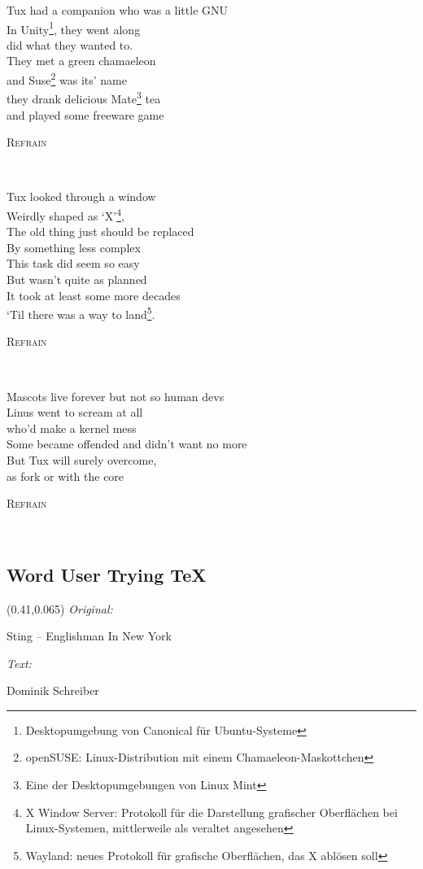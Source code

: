 \documentclass[11pt,a5paper]{article}
\newcommand\refrain[1]{\begin{tcolorbox}#1\end{tcolorbox} \ }
\newcommand{\refrefrain}{\refrain{\textsc{Refrain}} \ }
\newcommand\songinfo[2]{\begin{textblock}{0.5}(0.41,0.065)
		\footnotesize 
		\hfill \textit{Original:} \ \ \ \ \ \ \ \ \ \ \ \ \ \ \ \ \ \ \ \ 
		
		\hfill #1
		
		\hfill  \textit{Text:} \ \ \ \ \ \ \ \ \ \ \ \ \ \ \ \ \ \ \ \ 
		
		\hfill #2
	\end{textblock}}
\begin{document}
	Tux had a companion who was a little GNU \\
	In Unity\footnote{\scriptsize Desktopumgebung von Canonical für Ubuntu-Systeme}, they went along \\
	did what they wanted to. \\
	They met a green chamaeleon \\
	and Suse\footnote{\scriptsize openSUSE: Linux-Distribution mit einem Chamaeleon-Maskottchen} was its’ name \\
	they drank delicious Mate\footnote{\scriptsize Eine der Desktopumgebungen von Linux Mint} tea \\ 
	and played some freeware game \\
	
	\refrefrain
	
	Tux looked through a window \\
	Weirdly shaped as ‘X’\footnote{\scriptsize X Window Server: Protokoll für die Darstellung grafischer Oberflächen bei Linux-Systemen, mittlerweile als veraltet angesehen}, \\
	The old thing just should be replaced \\ 
	By something less complex \\
	This task did seem so easy \\
	But wasn’t quite as planned \\
	It took at least some more decades \\
	‘Til there was a way to land\footnote{\scriptsize Wayland: neues Protokoll für grafische Oberflächen, das X ablösen soll}. \\
	
	\refrefrain
	
	Mascots live forever but not so human devs \\
	Linus went to scream at all \\
	who’d make a kernel mess \\
	Some became offended and didn’t want no more \\
	But Tux will surely overcome,  \\
	as fork or with the core \\
	
	\refrefrain
	
	\pagebreak
	
	\subsection{Word User Trying \TeX }
	\songinfo{Sting -- Englishman In New York}{Dominik Schreiber}
	
\end{document}
